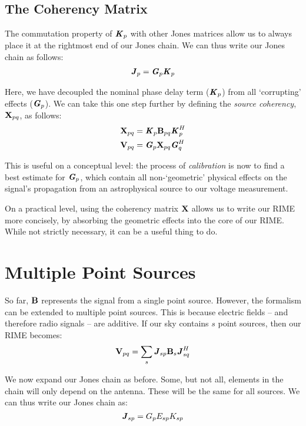 \subsection{The Coherency Matrix}
\label{section.RIME.JonesChain.CoherencyMatrix}

\pg
The commutation property of $\textbf{\emph{K}}_p$ with other Jones matrices allow us to always place it at the rightmost end of our Jones chain. We can thus write our Jones chain as follows:
\begin{align}
\textbf{\emph{J}}_p  &= \textbf{\emph{G}}_p \textbf{\emph{K}}_p\\
\end{align}

\pg
Here, we have decoupled the nominal phase delay term ($\textbf{\emph{K}}_p$) from all `corrupting' effects ($\textbf{\emph{G}}_p$). We can take this one step further by defining the \emph{source coherency}, $\textbf{X}_{pq}$, as follows:
\begin{align}\label{eq.def.coherency}
\textbf{X}_{pq} &= \textbf{\emph{K}}_p \textbf{B}_{pq} \textbf{\emph{K}}_p^H\\
\textbf{V}_{pq} &= \textbf{\emph{G}}_p \textbf{X}_{pq} \textbf{\emph{G}}_q^H
\end{align}

\pg
This is useful on a conceptual level: the process of \emph{calibration} is now to find a best estimate for $\textbf{\emph{G}}_p$, which contain all non-`geometric' physical effects on the signal's propagation from an astrophysical source to our voltage measurement.

\pg
On a practical level, using the coherency matrix $\textbf{X}$ allows us to write our RIME more concisely, by absorbing the geometric effects into the core of our RIME. While not strictly necessary, it can be a useful thing to do.

\section{Multiple Point Sources}
\label{section.RIME.MultiplePointSources}

\pg
So far, $\textbf{B}$ represents the signal from a single point source. However, the formalism can be extended to multiple point sources. This is because electric fields -- and therefore radio signals -- are additive. If our sky contains $s$ point sources, then our RIME becomes:
\begin{equation}
\textbf{V}_{pq} = \sum_s \textbf{\emph{J}}_{sp} \textbf{B}_s \textbf{\emph{J}}_{sq}^H
\end{equation}

\pg
We now expand our Jones chain as before. Some, but not all, elements in the chain will only depend on the antenna. These will be the same for all sources. We can thus write our Jones chain as:
\begin{equation}
\textbf{\emph{J}}_{sp} = G_p E_{sp} K_{sp}
\end{equation}

